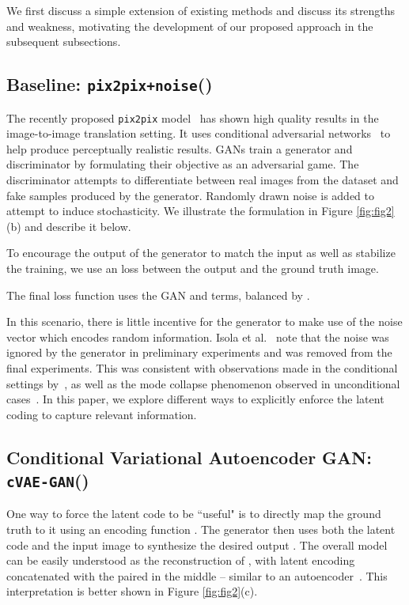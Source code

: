 \documentclass{article}
\newcommand{\pp}{\texttt{pix2pix}\xspace}
\newcommand{\ppn}{\texttt{pix2pix+noise}\xspace}
\newcommand{\cvaegan}{\texttt{cVAE-GAN}\xspace}
\begin{document}
We first discuss a simple extension of existing methods and discuss its strengths and weakness, motivating the development of our proposed approach in the subsequent subsections.

\subsection{Baseline: \ppn ()}
The recently proposed \pp model~\citep{isola2016image} has shown high quality results in the image-to-image translation setting.
It uses conditional adversarial networks~\citep{goodfellow2014generative,mirza2014conditional} to help produce perceptually realistic results. GANs train a generator  and discriminator  by formulating their objective as an adversarial game. The discriminator attempts to differentiate between real images from the dataset and fake samples produced by the generator. Randomly drawn noise  is added to attempt to induce stochasticity.
We illustrate the formulation in Figure \ref{fig:fig2}(b) and describe it below.


To encourage the output of the generator to match the input as well as stabilize the training, we use an  loss between the output and the ground truth image.


The final loss function uses the GAN and  terms, balanced by . 


In this scenario, there is little incentive for the generator to make use of the noise vector which encodes random information.
Isola et al.~\citep{isola2016image} note that the noise was ignored by the generator in preliminary experiments and was removed from the final experiments.
This was consistent with observations made in the conditional settings by~\citep{pathakCVPR16context,mathieu2015deep}, as well as the mode collapse phenomenon observed in unconditional cases~\citep{salimans2016improved,goodfellow2016nips}.
In this paper, we explore different ways to explicitly enforce
the latent coding to
capture relevant information.

\subsection{Conditional Variational Autoencoder GAN: \cvaegan ()}
One way to force the latent code  to be ``useful" is to directly map the ground truth  to it using an encoding function .
The generator  then uses both the latent code and the input image  to synthesize the desired output .
The overall model can be easily understood as the reconstruction of , with latent encoding  concatenated with the paired  in the middle -- similar to an autoencoder~\citep{hinton2006reducing}. This interpretation is better shown in Figure \ref{fig:fig2}(c).
\end{document}
